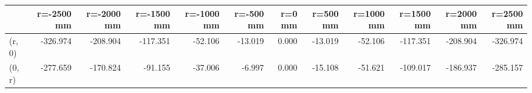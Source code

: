 \documentclass[convert={convertexe={magick.exe}}]{standalone}
\begin{document}
\begin{tabular}{lrrrrrrrrrrr}
\toprule
{} &  r=-2500 mm &  r=-2000 mm &  r=-1500 mm &  r=-1000 mm &  r=-500 mm &  r=0 mm &  r=500 mm &  r=1000 mm &  r=1500 mm &  r=2000 mm &  r=2500 mm \\
\midrule
(r, 0) &    -326.974 &    -208.904 &    -117.351 &     -52.106 &    -13.019 &   0.000 &   -13.019 &    -52.106 &   -117.351 &   -208.904 &   -326.974 \\
(0, r) &    -277.659 &    -170.824 &     -91.155 &     -37.006 &     -6.997 &   0.000 &   -15.108 &    -51.621 &   -109.017 &   -186.937 &   -285.157 \\
\bottomrule
\end{tabular}
\end{document}

